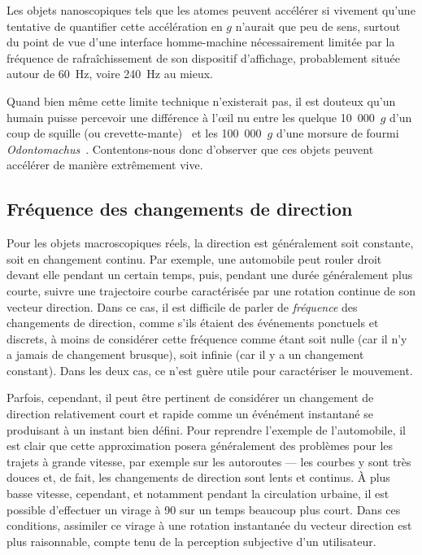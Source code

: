 	\addtocounter{footnote}{-1}
	\addtocounter{footnote}{1}
	
	Les objets nanoscopiques tels que les atomes peuvent accélérer si vivement qu'une tentative de quantifier cette accélération en $g$ n'aurait que peu de sens, surtout du point de vue d'une interface homme-machine nécessairement limitée par la fréquence de rafraîchissement de son dispositif d'affichage, probablement située autour de 60~Hz, voire 240~Hz au mieux\footnotemark{}.
	
	
	Quand bien même cette limite technique n'existerait pas, il est douteux qu'un humain puisse percevoir une différence à l'œil nu entre les quelque 10~000~$g$ d'un coup de squille (ou crevette-mante)~\cite{patek2004biomechanics} et les 100~000~$g$ d'une morsure de fourmi \emph{Odontomachus}~\cite{patek2006multifunctionality}. Contentons-nous donc d'observer que ces objets peuvent accélérer de manière extrêmement vive.
   
	\subsection{Fréquence des changements de direction}
	Pour les objets macroscopiques réels, la direction est généralement soit constante, soit en changement continu. Par exemple, une automobile peut rouler droit devant elle pendant un certain temps, puis, pendant une durée généralement plus courte, suivre une trajectoire courbe caractérisée par une rotation continue de son vecteur direction. Dans ce cas, il est difficile de parler de \emph{fréquence} des changements de direction, comme s'ils étaient des événements ponctuels et discrets, à moins de considérer cette fréquence comme étant soit nulle (car il n'y a jamais de changement brusque), soit infinie (car il y a un changement constant). Dans les deux cas, ce n'est guère utile pour caractériser le mouvement.
	
	Parfois, cependant, il peut être pertinent de considérer un changement de direction relativement court et rapide comme un événément instantané se produisant à un instant bien défini. Pour reprendre l'exemple de l'automobile, il est clair que cette approximation posera généralement des problèmes pour les trajets à grande vitesse, par exemple sur les autoroutes --- les courbes y sont très douces et, de fait, les changements de direction sont lents et continus. À plus basse vitesse, cependant, et notamment pendant la circulation urbaine, il est possible d'effectuer un virage à 90\textdegree{} sur un temps beaucoup plus court. Dans ces conditions, assimiler ce virage à une rotation instantanée du vecteur direction est plus raisonnable, compte tenu de la perception subjective d'un utilisateur.
	
